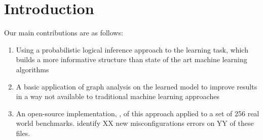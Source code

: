 \section{Introduction}
\label{sec-intro}


Our main contributions are as follows:

\begin{enumerate}

\item Using a probabilistic logical inference approach to the learning task, which builds a more informative structure than state of the art machine learning algorithms
 
\item A basic application of graph analysis on the learned model to improve results in a way not available to traditional machine learning approaches 

\item An open-source implementation, \app, of this approach applied to a set of 256 real world benchmarks. \app identify XX new misconfigurations errors on YY of these files.
\end{enumerate}
